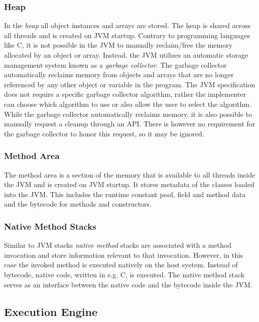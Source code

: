 \subsubsection{Heap}

In the \textit{heap} all object instances and arrays are stored. The heap is shared across all threads and is created on JVM startup. Contrary to programming languages like C, it is not possible in the JVM to manually reclaim/free the memory allocated by an object or array. Instead, the JVM utilizes an automatic storage management system known as a \textit{garbage collector}. The garbage collector automatically reclaims memory from objects and arrays that are no longer referenced by any other object or variable in the program. The JVM specification does not require a specific garbage collector algorithm, rather the implementer can choose which algorithm to use or also allow the user to select the algorithm. While the garbage collector automatically reclaims memory, it is also possible to manually request a cleanup through an API. There is however no requirement for the garbage collector to honor this request, so it may be ignored. 

\subsubsection{Method Area}

The method area is a section of the memory that is available to all threads inside the JVM and is created on JVM startup. It stores metadata of the classes loaded into the JVM. This includes the runtime constant pool, field and method data and the bytecode for methods and constructors.

\subsubsection{Native Method Stacks}

Similar to JVM stacks \textit{native method} stacks are associated with a method invocation and store information relevant to that invocation. However, in this case the invoked method is executed natively on the host system. Instead of bytecode, native code, written in e.g. C, is executed. The native method stack serves as an interface between the native code and the bytecode inside the JVM.  
  
\subsection{Execution Engine}

